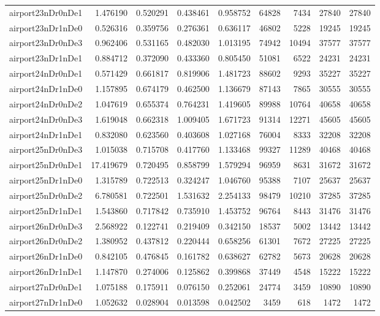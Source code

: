 \documentclass[../../../thesis.tex]{subfiles}
\begin{document}
\begin{longtable}{|l|r|r|r|r|r|r|r|r|}
airport23nDr0nDe1 & 1.476190 & 0.520291 & 0.438461 & 0.958752 & 64828 & 7434 & 27840 & 27840 \\
airport23nDr1nDe0 & 0.526316 & 0.359756 & 0.276361 & 0.636117 & 46802 & 5228 & 19245 & 19245 \\
airport23nDr0nDe3 & 0.962406 & 0.531165 & 0.482030 & 1.013195 & 74942 & 10494 & 37577 & 37577 \\
airport23nDr1nDe1 & 0.884712 & 0.372090 & 0.433360 & 0.805450 & 51081 & 6522 & 24231 & 24231 \\
airport24nDr0nDe1 & 0.571429 & 0.661817 & 0.819906 & 1.481723 & 88602 & 9293 & 35227 & 35227 \\
airport24nDr1nDe0 & 1.157895 & 0.674179 & 0.462500 & 1.136679 & 87143 & 7865 & 30555 & 30555 \\
airport24nDr0nDe2 & 1.047619 & 0.655374 & 0.764231 & 1.419605 & 89988 & 10764 & 40658 & 40658 \\
airport24nDr0nDe3 & 1.619048 & 0.662318 & 1.009405 & 1.671723 & 91314 & 12271 & 45605 & 45605 \\
airport24nDr1nDe1 & 0.832080 & 0.623560 & 0.403608 & 1.027168 & 76004 & 8333 & 32208 & 32208 \\
airport25nDr0nDe3 & 1.015038 & 0.715708 & 0.417760 & 1.133468 & 99327 & 11289 & 40468 & 40468 \\
airport25nDr0nDe1 & 17.419679 & 0.720495 & 0.858799 & 1.579294 & 96959 & 8631 & 31672 & 31672 \\
airport25nDr1nDe0 & 1.315789 & 0.722513 & 0.324247 & 1.046760 & 95388 & 7107 & 25637 & 25637 \\
airport25nDr0nDe2 & 6.780581 & 0.722501 & 1.531632 & 2.254133 & 98479 & 10210 & 37285 & 37285 \\
airport25nDr1nDe1 & 1.543860 & 0.717842 & 0.735910 & 1.453752 & 96764 & 8443 & 31476 & 31476 \\
airport26nDr0nDe3 & 2.568922 & 0.122741 & 0.219409 & 0.342150 & 18537 & 5002 & 13442 & 13442 \\
airport26nDr0nDe2 & 1.380952 & 0.437812 & 0.220444 & 0.658256 & 61301 & 7672 & 27225 & 27225 \\
airport26nDr1nDe0 & 0.842105 & 0.476845 & 0.161782 & 0.638627 & 62782 & 5673 & 20628 & 20628 \\
airport26nDr1nDe1 & 1.147870 & 0.274006 & 0.125862 & 0.399868 & 37449 & 4548 & 15222 & 15222 \\
airport27nDr0nDe1 & 1.075188 & 0.175911 & 0.076150 & 0.252061 & 24774 & 3459 & 10890 & 10890 \\
airport27nDr1nDe0 & 1.052632 & 0.028904 & 0.013598 & 0.042502 & 3459 & 618 & 1472 & 1472 \\

\end{longtable}
\end{document}
